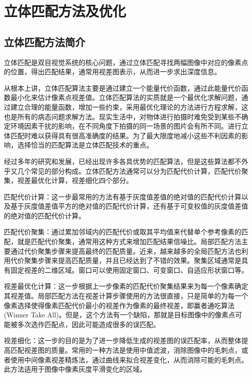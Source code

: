 
\chapter{立体匹配方法及优化}

\section{立体匹配方法简介}
立体匹配是双目视觉系统的核心问题，通过立体匹配寻找两幅图像中对应的像素点的位置，得出匹配结果，通常用视差图表示，从而进一步求出深度信息。

从根本上讲，立体匹配算法主要是通过建立一个能量代价函数，通过此能量代价函数最小化来估计像素点视差值。立体匹配算法的实质就是一个最优化求解问题，通过建立合理的能量函数，增加一些约束，采用最优化理论的方法进行方程求解，这也是所有的病态问题求解方法。现实生活中，对物体进行拍摄时难免受到某些不确定环境因素干扰的影响，在不同角度下拍摄的同一场景的图片会有所不同。进行立体匹配时难以获得具有很高准确度的结果。为了最大限度地减小这些不利因素的影响，选择恰当的匹配算法是立体匹配技术的重点。

经过多年的研究和发展，已经出现许多各具优势的匹配算法，但是这些算法都不外乎又几个常见的部分构成。立体匹配方法通常可以分为匹配代价计算，匹配代价聚集，视差最优化计算，视差细化四个部分。

匹配代价计算：这一步最常用的方法有基于灰度值差值的绝对值的匹配代价计算以及基于灰度值差值平方的绝对值的匹配代价计算，还有基于可变权值的灰度值差值的绝对值的匹配代价计算。 

匹配代价聚集：通过累加邻域内的匹配代价或取其平均值来代替单个参考像素的匹配，就是匹配代价聚集，通常用这种方式来增加匹配结果信噪比。局部匹配方法主要通过代价聚集步骤来提高最终的匹配质量。近来，越来越多的全局匹配方法也利用代价聚集步骤来提高匹配质量，并且已经达到了不错的效果。聚集区域通常是具有固定视差的二维区域。窗口可以使用固定窗口、可变窗口、自适应形状窗口等。 

视差最优化计算：这一步根据上一步像素的匹配代价聚集结果来为每一个像素确定其视差值。局部匹配方法在视差计算步骤使用的方法很直接，只是简单的为每一个像素选择使得像素匹配代价最小的视差作为像素的最终视差，即赢者通吃算法(Winner Take All)。但是，这个方法有一个缺陷，那就是目标图像中的像素点可能被多次选作匹配点，因此可能造成很多的误匹配。

视差细化：这一步的目的是为了进一步降低生成的视差图的误匹配率，从而整体提高匹配视差图的质量。常用的一种方法是使用中值滤波，消除图像中的毛刺点，或者使用中间像素视差精炼法，通过曲线来拟合视差变化，从而消除可能的毛刺点。此方法适用于图像中像素灰度平滑变化的区域。

